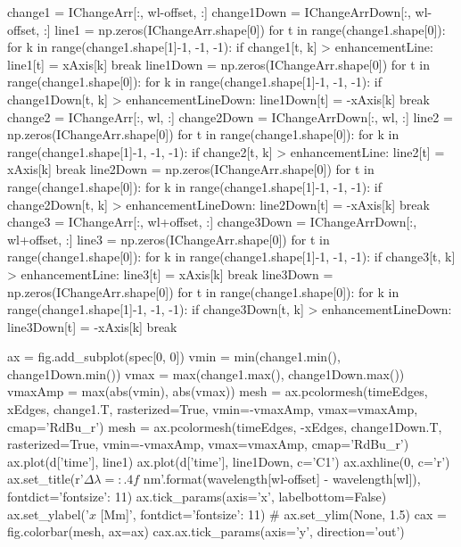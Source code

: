 \begin{pycode}[2DRT]
    change1 = IChangeArr[:, wl-offset, :]
    change1Down = IChangeArrDown[:, wl-offset, :]
    line1 = np.zeros(IChangeArr.shape[0])
    for t in range(change1.shape[0]):
        for k in range(change1.shape[1]-1, -1, -1):
            if change1[t, k] > enhancementLine:
                line1[t] = xAxis[k]
                break
    line1Down = np.zeros(IChangeArr.shape[0])
    for t in range(change1.shape[0]):
        for k in range(change1.shape[1]-1, -1, -1):
            if change1Down[t, k] > enhancementLineDown:
                line1Down[t] = -xAxis[k]
                break
    change2 = IChangeArr[:, wl, :]
    change2Down = IChangeArrDown[:, wl, :]
    line2 = np.zeros(IChangeArr.shape[0])
    for t in range(change1.shape[0]):
        for k in range(change1.shape[1]-1, -1, -1):
            if change2[t, k] > enhancementLine:
                line2[t] = xAxis[k]
                break
    line2Down = np.zeros(IChangeArr.shape[0])
    for t in range(change1.shape[0]):
        for k in range(change1.shape[1]-1, -1, -1):
            if change2Down[t, k] > enhancementLineDown:
                line2Down[t] = -xAxis[k]
                break
    change3 = IChangeArr[:, wl+offset, :]
    change3Down = IChangeArrDown[:, wl+offset, :]
    line3 = np.zeros(IChangeArr.shape[0])
    for t in range(change1.shape[0]):
        for k in range(change1.shape[1]-1, -1, -1):
            if change3[t, k] > enhancementLine:
                line3[t] = xAxis[k]
                break
    line3Down = np.zeros(IChangeArr.shape[0])
    for t in range(change1.shape[0]):
        for k in range(change1.shape[1]-1, -1, -1):
            if change3Down[t, k] > enhancementLineDown:
                line3Down[t] = -xAxis[k]
                break

    ax = fig.add_subplot(spec[0, 0])
    vmin = min(change1.min(), change1Down.min())
    vmax = max(change1.max(), change1Down.max())
    vmaxAmp = max(abs(vmin), abs(vmax))
    mesh = ax.pcolormesh(timeEdges, xEdges, change1.T, rasterized=True, vmin=-vmaxAmp, vmax=vmaxAmp, cmap='RdBu_r')
    mesh = ax.pcolormesh(timeEdges, -xEdges, change1Down.T, rasterized=True, vmin=-vmaxAmp, vmax=vmaxAmp, cmap='RdBu_r')
    ax.plot(d['time'], line1)
    ax.plot(d['time'], line1Down, c='C1')
    ax.axhline(0, c='r')
    ax.set_title(r'$\Delta\lambda={:.4f}$ nm'.format(wavelength[wl-offset] - wavelength[wl]), fontdict={'fontsize': 11})
    ax.tick_params(axis='x', labelbottom=False)
    ax.set_ylabel('$x$ [Mm]', fontdict={'fontsize': 11})
#     ax.set_ylim(None, 1.5)
    cax = fig.colorbar(mesh, ax=ax)
    cax.ax.tick_params(axis='y', direction='out')


\end{pycode}
